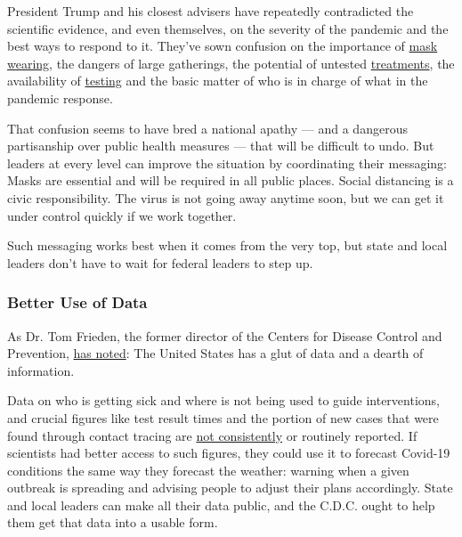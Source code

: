 President Trump and his closest advisers have repeatedly contradicted
the scientific evidence, and even themselves, on the severity of the
pandemic and the best ways to respond to it. They've sown confusion on
the importance of
\href{https://www.nytimes.com/2020/07/21/us/politics/trump-coronavirus-masks.html}{mask
wearing}, the dangers of large gatherings, the potential of untested
\href{https://www.nytimes.com/2020/04/26/us/politics/trump-disinfectant-coronavirus.html}{treatments},
the availability of
\href{https://www.nytimes.com/2020/07/31/us/politics/trump-coronavirus-testing.html}{testing}
and the basic matter of who is in charge of what in the pandemic
response.

That confusion seems to have bred a national apathy --- and a dangerous
partisanship over public health measures --- that will be difficult to
undo. But leaders at every level can improve the situation by
coordinating their messaging: Masks are essential and will be required
in all public places. Social distancing is a civic responsibility. The
virus is not going away anytime soon, but we can get it under control
quickly if we work together.

Such messaging works best when it comes from the very top, but state and
local leaders don't have to wait for federal leaders to step up.

\hypertarget{better-use-of-data}{%
\subsubsection{Better Use of Data}\label{better-use-of-data}}

As Dr. Tom Frieden, the former director of the Centers for Disease
Control and Prevention,
\href{https://www.statnews.com/2020/07/21/group-calls-for-standardized-data-collection-to-track-covid19/}{has
noted}: The United States has a glut of data and a dearth of
information.

Data on who is getting sick and where is not being used to guide
interventions, and crucial figures like test result times and the
portion of new cases that were found through contact tracing are
\href{https://preventepidemics.org/covid19/resources/indicators/}{not
consistently} or routinely reported. If scientists had better access to
such figures, they could use it to forecast Covid-19 conditions the same
way they forecast the weather: warning when a given outbreak is
spreading and advising people to adjust their plans accordingly. State
and local leaders can make all their data public, and the C.D.C. ought
to help them get that data into a usable form.

